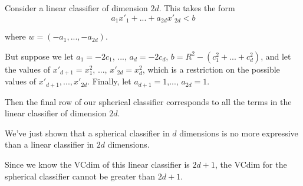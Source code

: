 \documentclass[]{article}
\begin{document}
Consider a linear classifier of dimension $2d$. This takes the form
\[
a_1x'_1 + ... + a_{2d}x'_{2d} < b
\]

where $w = (-a_1,...,-a_{2d})$.

But suppose we let $a_1 = -2c_1$, ..., $a_d = -2c_d$, $b = R^2 - (c_1^2 + ... + c_d^2)$, and let the values of $x'_{d+1} = x_1^2$, ..., $x'_{2d} = x_d^2$, which is a restriction on the possible values of $x'_{d+1},...,x'_{2d}$. Finally, let $a_{d+1} = 1$,..., $a_{2d} = 1$.

Then the final row of our spherical classifier corresponds to all the terms in the linear classifier of dimension $2d$.

We've just shown that a spherical classifier in $d$ dimensions is no more expressive than a linear classifier in $2d$ dimensions.

Since we know the VCdim of this linear classifier is $2d+1$, the VCdim for the spherical classifier cannot be greater than $2d+1$.
\end{document}
